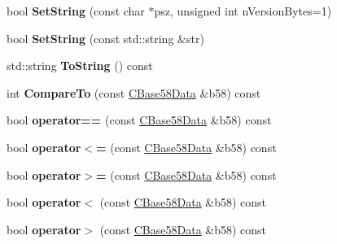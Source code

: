 \begin{DoxyCompactItemize}
\item 
\mbox{\label{class_c_base58_data_a250fa3bc97d03c7d87de5485c8b49b57}} 
bool {\bfseries Set\+String} (const char $\ast$psz, unsigned int n\+Version\+Bytes=1)
\item 
\mbox{\label{class_c_base58_data_a8e0cba75a3e0a5b21defaf1471d8659c}} 
bool {\bfseries Set\+String} (const std\+::string \&str)
\item 
\mbox{\label{class_c_base58_data_a7dc91af403ca02694b3247b15604e220}} 
std\+::string {\bfseries To\+String} () const
\item 
\mbox{\label{class_c_base58_data_ad89d6bd7afa8d831dffce12803c5f58d}} 
int {\bfseries Compare\+To} (const \mbox{\hyperlink{class_c_base58_data}{C\+Base58\+Data}} \&b58) const
\item 
\mbox{\label{class_c_base58_data_a2e7a634c3a008adf3f74d72ed9dbd68c}} 
bool {\bfseries operator==} (const \mbox{\hyperlink{class_c_base58_data}{C\+Base58\+Data}} \&b58) const
\item 
\mbox{\label{class_c_base58_data_a1d99c2d0a82cbe648ba2a99e41386486}} 
bool {\bfseries operator$<$=} (const \mbox{\hyperlink{class_c_base58_data}{C\+Base58\+Data}} \&b58) const
\item 
\mbox{\label{class_c_base58_data_a0cac1805398e2b09a498ba884c7a0057}} 
bool {\bfseries operator$>$=} (const \mbox{\hyperlink{class_c_base58_data}{C\+Base58\+Data}} \&b58) const
\item 
\mbox{\label{class_c_base58_data_a7377c5628c43551ca22af1c0dfbaebae}} 
bool {\bfseries operator$<$} (const \mbox{\hyperlink{class_c_base58_data}{C\+Base58\+Data}} \&b58) const
\item 
\mbox{\label{class_c_base58_data_a7d8052eacc8de55a0f4ec91306dfbec3}} 
bool {\bfseries operator$>$} (const \mbox{\hyperlink{class_c_base58_data}{C\+Base58\+Data}} \&b58) const
\end{DoxyCompactItemize}
